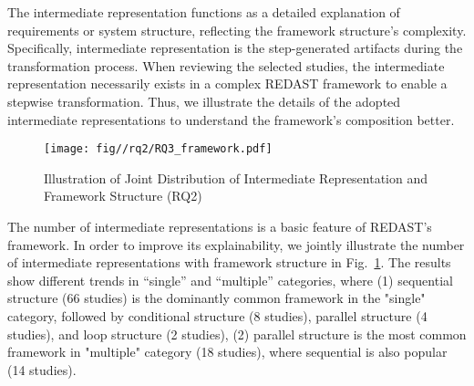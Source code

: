 The intermediate representation functions as a detailed explanation of requirements or system structure, reflecting the framework structure's complexity. Specifically, intermediate representation is the step-generated artifacts during the transformation process. When reviewing the selected studies, the intermediate representation necessarily exists in a complex REDAST framework to enable a stepwise transformation. Thus, we illustrate the details of the adopted intermediate representations to understand the framework's composition better.

\begin{figure}
    \centering
    \texttt{[image: fig//rq2/RQ3\_framework.pdf]}
    \caption{Illustration of Joint Distribution of Intermediate Representation and Framework Structure (RQ2)}
    \label{fig:framework_bar}
\end{figure}

The number of intermediate representations is a basic feature of REDAST's framework. In order to improve its explainability, we jointly illustrate the number of intermediate representations with framework structure in Fig.~\ref{fig:framework_bar}. The results show different trends in ``single'' and ``multiple'' categories, where (1) sequential structure (66 studies) is the dominantly common framework in the "single" category, followed by conditional structure (8 studies), parallel structure (4 studies), and loop structure (2 studies), (2) parallel structure is the most common framework in "multiple" category (18 studies), where sequential is also popular (14 studies).





